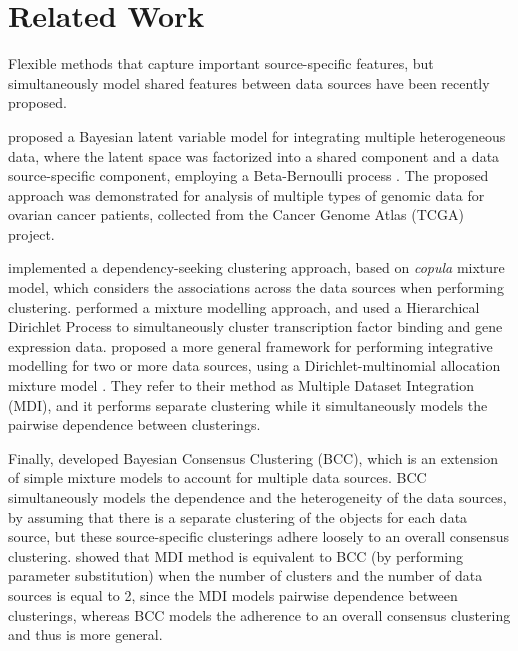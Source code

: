 \section{Related Work} \label{integr-related-work-sect}
Flexible methods that capture important source-specific features, but simultaneously model shared features between data sources have been recently proposed. 

\citet{Ray2012} proposed a Bayesian latent variable model for integrating multiple heterogeneous data, where the latent space was factorized into a shared component and a data source-specific component, employing a Beta-Bernoulli process \citep{Griffiths2005}. The proposed approach was demonstrated for analysis of multiple types of genomic data for ovarian cancer patients, collected from the Cancer Genome Atlas (TCGA) project.

\citet{Rey2012} implemented a dependency-seeking clustering approach, based on \emph{copula} mixture model, which considers the associations across the data sources when performing clustering. \citet{Savage2010} performed a mixture modelling approach, and used a Hierarchical Dirichlet Process \citep{Ferguson1973, Escobar1995} to simultaneously cluster transcription factor binding and gene expression data. \citet{Kirk2012} proposed a more general framework for performing integrative modelling for two or more data sources, using a Dirichlet-multinomial allocation mixture model \citep{Green2001}. They refer to their method as Multiple Dataset Integration (MDI), and it performs separate clustering while it simultaneously models the pairwise dependence between clusterings. 

Finally, \citet{Lock2013} developed Bayesian Consensus Clustering (BCC), which is an extension of simple mixture models to account for multiple data sources. BCC simultaneously models the dependence and the heterogeneity of the data sources, by assuming that there is a separate clustering of the objects for each data source, but these source-specific clusterings adhere loosely to an overall consensus clustering. \citet{Lock2013} showed that MDI method is equivalent to BCC (by performing parameter substitution) when the number of clusters and the number of data sources is equal to 2, since the MDI models pairwise dependence between clusterings, whereas BCC models the adherence to an overall consensus clustering and thus is more general.